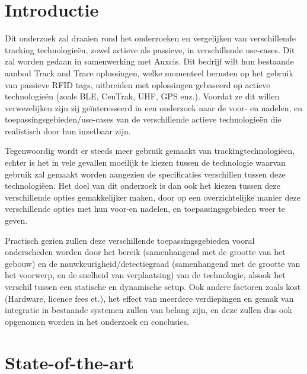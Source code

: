 \section{Introductie} %
\label{sec:introductie}

Dit onderzoek zal draaien rond het onderzoeken en vergelijken van verschillende tracking technologieën, zowel actieve als passieve, in verschillende use-cases. Dit zal worden gedaan in samenwerking met Auxcis. Dit bedrijf wilt hun bestaande aanbod Track and Trace oplossingen, welke momenteel berusten op het gebruik van passieve RFID tags, uitbreiden met oplossingen gebaseerd op actieve technologieën (zoals BLE, CenTrak, UHF, GPS enz.). Voordat ze dit willen verwezelijken zijn zij geïnteresseerd in een onderzoek naar de voor- en nadelen, en toepassingsgebieden/use-cases van de verschillende actieve technologieën die realistisch door hun inzetbaar zijn.

Tegenwoordig wordt er steeds meer gebruik gemaakt van trackingtechnologiëen, echter is het in vele gevallen moeilijk te kiezen tussen de technologie waarvan gebruik zal gemaakt worden aangezien de specificaties verschillen tussen deze technologiëen. Het doel van dit onderzoek is dan ook het kiezen tussen deze verschillende opties gemakkelijker maken, door op een overzichtelijke manier deze verschillende opties met hun voor-en nadelen, en toepassingsgebieden weer te geven.

Practisch gezien zullen deze verschillende toepassingsgebieden vooral onderscheden worden door het bereik (samenhangend met de grootte van het gebouw) en de nauwkeurigheid/detectiegraad (samenhangend met de grootte van het voorwerp, en de snelheid van verplaatsing) van de technologie, alsook het verschil tussen een statische en dynamische setup. Ook andere factoren zoals kost (Hardware, licence fees et.), het effect van meerdere verdiepingen en gemak van integratie in bestaande systemen zullen van belang zijn, en deze zullen dus ook opgenomen worden in het onderzoek en conclusies.


\section{State-of-the-art}
\label{sec:state-of-the-art}

